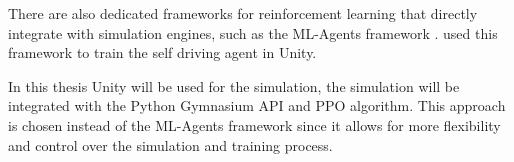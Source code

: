 There are also dedicated frameworks for reinforcement learning that directly integrate with simulation engines, such as the ML-Agents framework \autocite{mlagents}. \autocite{maximilian} used this framework to train the self driving agent in Unity.

In this thesis Unity will be used for the simulation, the simulation will be integrated with the Python Gymnasium API and PPO algorithm. This approach is chosen instead of the ML-Agents framework since it allows for more flexibility and control over the simulation and training process.















